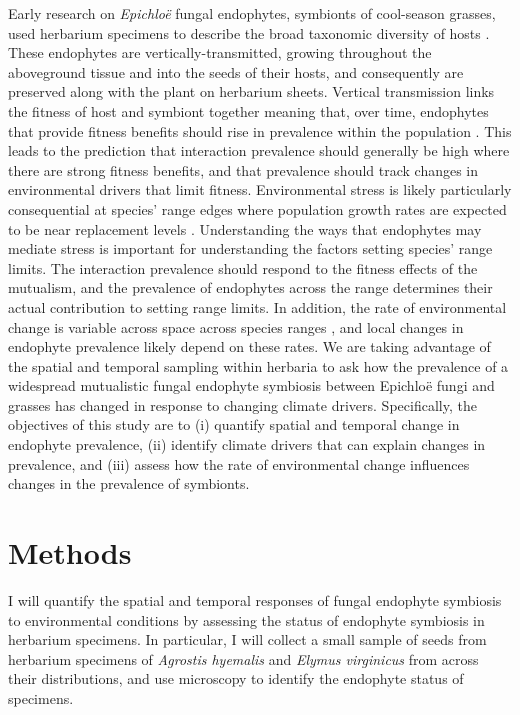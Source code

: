 \documentclass[11pt]{article}
\begin{document}
Early research on \emph{Epichloë} fungal endophytes, symbionts of cool-season grasses, used herbarium specimens to describe the broad taxonomic diversity of hosts \citep{white1985endophyte}. 
These endophytes are vertically-transmitted, growing throughout the aboveground tissue and into the seeds of their hosts, and consequently are preserved along with the plant on herbarium sheets. 
Vertical transmission links the fitness of host and symbiont together meaning that, over time, endophytes that provide fitness benefits should rise in prevalence within the population \citep{fine1975vectors, douglas1998host, rudgers2009fungus}. 
This leads to the prediction that interaction prevalence should generally be high where there are strong fitness benefits, and that prevalence should track changes in environmental drivers that limit fitness. 
Environmental stress is likely particularly consequential at species' range edges where population growth rates are expected to be near replacement levels \cite{}. 
Understanding the ways that endophytes may mediate stress is important for understanding the factors setting species' range limits. 
The interaction prevalence should respond to the fitness effects of the mutualism, and the prevalence of endophytes across the range determines their actual contribution to setting range limits. 
In addition, the rate of environmental change is variable across space across species ranges \citep{IPCC2012managing}, and local changes in endophyte prevalence likely depend on these rates. 
We are taking advantage of the spatial and temporal sampling within herbaria to ask how the prevalence of a widespread mutualistic fungal endophyte symbiosis between Epichloë fungi and grasses has changed in response to changing climate drivers.
Specifically, the objectives of this study are to (i) quantify spatial and temporal change in endophyte prevalence, (ii) identify climate drivers that can explain changes in prevalence, and (iii) assess how the rate of environmental change influences changes in the prevalence of symbionts.

	
	\section*{Methods}
	
I will quantify the spatial and temporal responses of fungal endophyte symbiosis to environmental conditions by assessing the status of endophyte symbiosis in herbarium specimens. 
In particular, I will collect a small sample of seeds from herbarium specimens of \emph{Agrostis hyemalis} and \emph{Elymus virginicus} from across their distributions, and use microscopy to identify the endophyte status of specimens.
\end{document}
